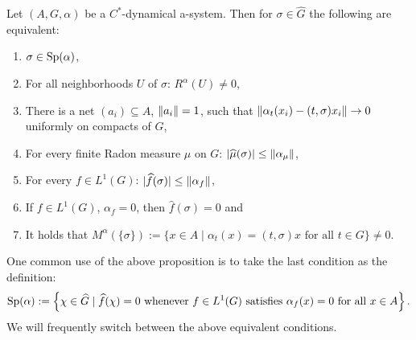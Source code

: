 \begin{proposition}
	Let $(A, G, \alpha)$ be a $C^*$-dynamical a-system. Then for $\sigma \in \hat G$ the following are equivalent:
	\begin{enumerate}[nosep]
		\item $\sigma \in \mathrm{Sp}(\alpha)$,
		\item For all neighborhoods $U$ of $\sigma$: $R^\alpha(U) \neq 0$,
		\item There is a net $(a_i) \subseteq A$, $\left\lVert a_i \right\rVert = 1$, such that $\left\lVert\alpha_t(x_i) - (t,\sigma)x_i\right\rVert \to 0$ uniformly on compacts of $G$,
		\item For every finite Radon measure $\mu$ on $G$: $|\widehat{\mu}(\sigma)| \leq \left\lVert \alpha_\mu\right\rVert$,
		\item For every $f \in L^1(G)$: $|\widehat{f} (\sigma)| \leq \left\lVert \alpha_f\right\rVert$,
		\item If $f \in L^1(G)$, $\alpha_f=0$, then $\hat f(\sigma)=0$ and
		\item It holds that $M^{\alpha}(\{\sigma\}) := \{x \in A \mid  \alpha_t(x) = (t,\sigma)x \text{ for all } t \in G\} \neq 0$.
	\end{enumerate}
\end{proposition}
One common use of the above proposition is to take the last condition as the definition:
\begin{align*}
		\mathrm{Sp}(\alpha) := \left\{ \chi \in \widehat{G} \mid \widehat{f}(\chi) = 0 \text{ whenever } f \in L^1(G) \text{ satisfies } \alpha_f(x) = 0 \text{ for all } x \in A  \right\}.
	\end{align*}
We will frequently switch between the above equivalent conditions.

